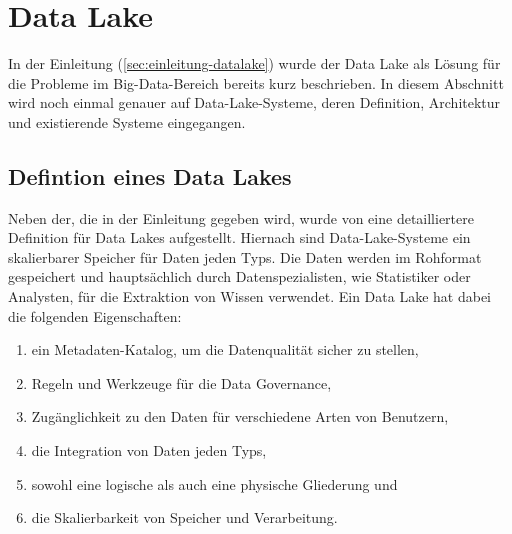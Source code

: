 \section{Data Lake}
In der Einleitung (\cref{sec:einleitung-datalake}) wurde der Data Lake als Lösung für die Probleme im Big-Data-Bereich bereits kurz beschrieben. 
In diesem Abschnitt wird noch einmal genauer auf Data-Lake-Systeme, deren Definition, Architektur und existierende Systeme eingegangen.

\subsection{Defintion eines Data Lakes}
Neben der, die in der Einleitung gegeben wird, wurde von \textcite{sawadogo2021data} eine detailliertere Definition für Data Lakes aufgestellt.
Hiernach sind Data-Lake-Systeme ein skalierbarer Speicher für Daten jeden Typs.
Die Daten werden im Rohformat gespeichert und hauptsächlich durch Datenspezialisten, wie Statistiker oder Analysten, für die Extraktion von Wissen verwendet.
Ein Data Lake hat dabei die folgenden Eigenschaften: \begin{enumerate}
    \item ein Metadaten-Katalog, um die Datenqualität sicher zu stellen,
    \item Regeln und Werkzeuge für die Data Governance,
    \item Zugänglichkeit zu den Daten für verschiedene Arten von Benutzern,
    \item die Integration von Daten jeden Typs,
    \item sowohl eine logische als auch eine physische Gliederung und
    \item die Skalierbarkeit von Speicher und Verarbeitung.
\end{enumerate}

